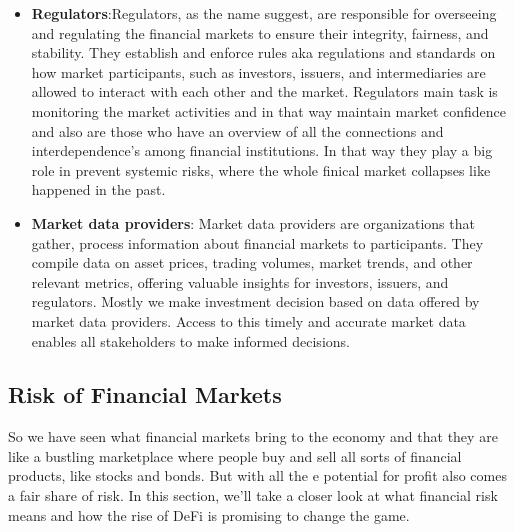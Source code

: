 \documentclass{article}
\begin{document}
\begin{itemize}
\item \textbf{Regulators}:Regulators, as the name suggest, are responsible for overseeing and regulating the financial markets to ensure their integrity, fairness, and stability. They establish and enforce rules aka regulations and standards on how market participants, such as investors, issuers, and intermediaries are allowed to interact with each other and the market. Regulators main task is monitoring the market activities and in that way maintain market confidence and also are those who have an overview of all the connections and interdependence's among financial institutions. In that way they play a big role in prevent systemic risks, where the whole finical market collapses like happened in the past.

\item \textbf{Market data providers}: Market data providers are organizations that gather, process information about financial markets to participants. They compile data on asset prices, trading volumes, market trends, and other relevant metrics, offering valuable insights for investors, issuers, and regulators. Mostly we make investment decision based on data offered by market data providers. Access to this timely and accurate market data enables all stakeholders to make informed decisions.
\end{itemize}

\subsection{Risk of Financial Markets} 
So we have seen what financial markets bring to the economy and that they are like a bustling marketplace where people buy and sell all sorts of financial products, like stocks and bonds. But with all the e potential for profit also comes a fair share of risk. In this section, we'll take a closer look at what financial risk means and how the rise of DeFi is promising to change the game.
\end{document}
